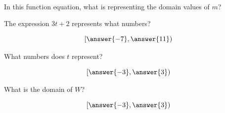 \documentclass{ximera}
\begin{document}
\begin{example}
\begin{question}
In this function equation, what is representing the domain values of $m$?

\begin{multipleChoice}
\end{multipleChoice}



The expression $3t + 2$ represents what numbers?


\[
\left[ \answer{-7}, \answer{11} \right)
\]


What numbers does $t$ represent?


\[
\left[ \answer{-3}, \answer{3} \right)
\]


\end{question}



\begin{question}

What is the domain of $W$?



\[
\left[ \answer{-3}, \answer{3} \right)
\]
\end{question}



\end{example}
\end{document}
